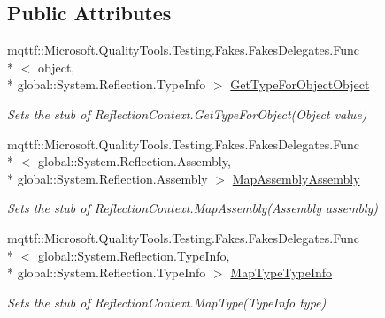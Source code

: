 \subsection*{Public Attributes}
\begin{DoxyCompactItemize}
\item 
mqttf\-::\-Microsoft.\-Quality\-Tools.\-Testing.\-Fakes.\-Fakes\-Delegates.\-Func\\*
$<$ object, \\*
global\-::\-System.\-Reflection.\-Type\-Info $>$ \hyperlink{class_system_1_1_reflection_1_1_fakes_1_1_stub_reflection_context_ae480a6930b54dbc0f5b639fc78af2e8f}{Get\-Type\-For\-Object\-Object}
\begin{DoxyCompactList}\small\item\em Sets the stub of Reflection\-Context.\-Get\-Type\-For\-Object(\-Object value)\end{DoxyCompactList}\item 
mqttf\-::\-Microsoft.\-Quality\-Tools.\-Testing.\-Fakes.\-Fakes\-Delegates.\-Func\\*
$<$ global\-::\-System.\-Reflection.\-Assembly, \\*
global\-::\-System.\-Reflection.\-Assembly $>$ \hyperlink{class_system_1_1_reflection_1_1_fakes_1_1_stub_reflection_context_a537f67b1a2c6401bef53182705d44eb3}{Map\-Assembly\-Assembly}
\begin{DoxyCompactList}\small\item\em Sets the stub of Reflection\-Context.\-Map\-Assembly(\-Assembly assembly)\end{DoxyCompactList}\item 
mqttf\-::\-Microsoft.\-Quality\-Tools.\-Testing.\-Fakes.\-Fakes\-Delegates.\-Func\\*
$<$ global\-::\-System.\-Reflection.\-Type\-Info, \\*
global\-::\-System.\-Reflection.\-Type\-Info $>$ \hyperlink{class_system_1_1_reflection_1_1_fakes_1_1_stub_reflection_context_a1d6b6e2142724c81acddba1c57b04350}{Map\-Type\-Type\-Info}
\begin{DoxyCompactList}\small\item\em Sets the stub of Reflection\-Context.\-Map\-Type(\-Type\-Info type)\end{DoxyCompactList}\end{DoxyCompactItemize}
